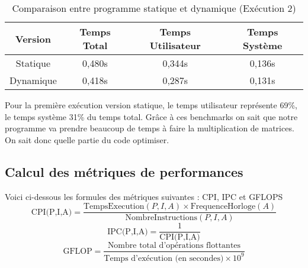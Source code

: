 \documentclass{rapport}
\begin{document}
\begin{table}[h!]
    \centering
    \begin{tabular}{|c|c|c|c|}
        \hline
        Version & Temps Total & Temps Utilisateur & Temps Système \\
        \hline
        Statique & 0,480s & 0,344s & 0,136s \\
        \hline
        Dynamique & 0,418s & 0,287s & 0,131s \\
        \hline
    \end{tabular}
    \caption{Comparaison entre programme statique et dynamique (Exécution 2)}
    \label{tab:graph_characteristics_2}
\end{table}

      Pour la première exécution version statique, le temps utilisateur représente 69\%, le temps système 31\% du temps total.
      Grâce à ces benchmarks on sait que notre programme va prendre beaucoup de temps à faire la multiplication de matrices. On sait donc quelle partie du code optimiser.
    \subsection{Calcul des métriques de performances}
    Voici ci-dessous les formules des métriques suivantes : CPI, IPC et GFLOPS
\[
\text{CPI(P,I,A)} = \frac{\text{TempsExecution}(P, I, A)\times \text{FrequenceHorloge}(A)}{\text{NombreInstructions}(P, I, A)} 
\]
\[
\text{IPC(P,I,A)} = \frac{1}{\text{CPI(P,I,A)}}
\]
\[
\text{GFLOP} = \frac{\text{Nombre total d'opérations flottantes}}{\text{Temps d'exécution (en secondes)} \times 10^9}
\]
\end{document}
